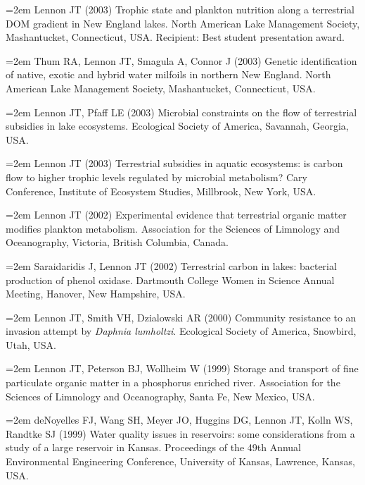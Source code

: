 \documentclass[11pt]{article}
\begin{document}
{\hangindent=2em Lennon JT (2003) Trophic state and plankton nutrition along a terrestrial DOM gradient in New England lakes. North American Lake Management Society, Mashantucket, Connecticut, USA. Recipient: Best student presentation award. \par

\hangindent=2em Thum RA, Lennon JT, Smagula A, Connor J (2003) Genetic identification of native, exotic and hybrid water milfoils in northern New England. North American Lake Management Society, Mashantucket, Connecticut, USA. \par

\hangindent=2em Lennon JT, Pfaff LE (2003) Microbial constraints on the flow of terrestrial subsidies in lake ecosystems. Ecological Society of America, Savannah, Georgia, USA. \par

\hangindent=2em Lennon JT (2003) Terrestrial subsidies in aquatic ecosystems: is carbon flow to higher trophic levels regulated by microbial metabolism? Cary Conference, Institute of Ecosystem Studies, Millbrook, New York, USA. \par

\hangindent=2em Lennon JT (2002) Experimental evidence that terrestrial organic matter modifies plankton metabolism. Association for the Sciences of Limnology and Oceanography, Victoria, British Columbia, Canada. \par

\hangindent=2em Saraidaridis J, Lennon JT (2002) Terrestrial carbon in lakes: bacterial production of phenol oxidase. Dartmouth College Women in Science Annual Meeting, Hanover, New Hampshire, USA. \par

\hangindent=2em Lennon JT, Smith VH, Dzialowski AR (2000) Community resistance to an invasion attempt by \textit{Daphnia lumholtzi}. Ecological Society of America, Snowbird, Utah, USA. \par

\hangindent=2em Lennon JT, Peterson BJ, Wollheim W (1999) Storage and transport of fine particulate organic matter in a phosphorus enriched river. Association for the Sciences of Limnology and Oceanography, Santa Fe, New Mexico, USA. \par

\hangindent=2em deNoyelles FJ, Wang SH, Meyer JO, Huggins DG, Lennon JT, Kolln WS, Randtke SJ (1999) Water quality issues in reservoirs: some considerations from a study of a large reservoir in Kansas. Proceedings of the 49th Annual Environmental Engineering Conference, University of Kansas, Lawrence, Kansas, USA. \par

}
\end{document}
